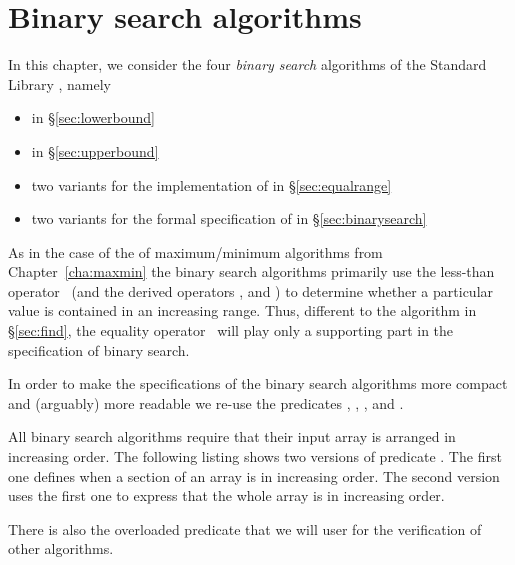 
\chapter{Binary search algorithms}

In this chapter, we consider the four
\emph{binary search} algorithms of the \cxx Standard Library \cite[\S
28.7.3]{cxx-17-draft}, namely

\begin{itemize}
\item \lowerbound in \S\ref{sec:lowerbound}

\item \upperbound in \S\ref{sec:upperbound}

\item two variants for the implementation of  \equalrange in \S\ref{sec:equalrange}

\item two variants for the formal specification of \binarysearch in \S\ref{sec:binarysearch}
\end{itemize}

As in the case of the of maximum/minimum algorithms from Chapter~\ref{cha:maxmin}
the binary search algorithms primarily use the less-than operator~\inl{<}
(and the derived operators \inl{<=}, \inl{>} and \inl{>=}) to determine whether a particular
value is contained in an increasing range.
Thus, different to the \find algorithm in \S\ref{sec:find},
the equality operator~\inl{==} will play only a supporting part
in the specification of binary search.

In order to make the specifications of the binary search algorithms 
more compact and (arguably) more readable we re-use the predicates
, ,
, and .

All binary search algorithms require that their input array is arranged in 
increasing order.
The following listing shows two versions of predicate .
The first one defines when a section of an array is in increasing order.
The second version uses the first one to express that the whole array is in increasing order.




There is also the overloaded predicate  that we will user for 
the verification of other algorithms.

